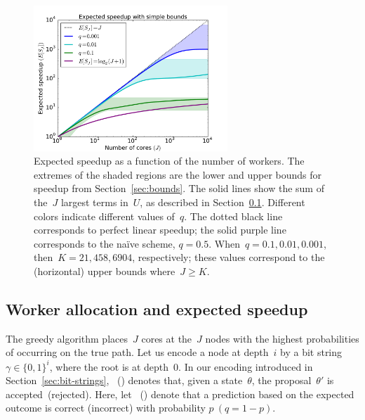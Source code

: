 \documentclass[angelino.tex]{subfiles}
\begin{document}
\begin{figure}[t!]
\centering
\includegraphics[width=0.65\textwidth]{figs/expected-speedup.pdf}
\caption{Expected speedup as a function of the number of workers.
The extremes of the shaded regions are the lower and upper bounds
for speedup from Section~\ref{sec:bounds}.
The solid lines show the sum of the~$J$ largest terms in~$U$, as described in
Section~\ref{sec:allocation}.
Different colors indicate different values of~$q$.
The dotted black line corresponds to perfect linear speedup;
the solid purple line corresponds to the na\"ive scheme, \ie ${q=0.5}$.
When~${q=0.1, 0.01, 0.001}$, then~${K=21, 458, 6904}$, respectively;
these values correspond to the (horizontal) upper bounds where~${J \ge K}$.
}
\label{fig:expected-speedup}
\end{figure}


\subsection{Worker allocation and expected speedup}
\label{sec:allocation}

The greedy algorithm places~$J$ cores at the~$J$ nodes with the
highest probabilities of occurring on the true path.  
Let us encode a node at depth~$i$ by a bit string 
${\gamma \in \{0, 1\}^i}$, where the root is at depth~0.
In our encoding introduced in Section~\ref{sec:bit-strings},
~() denotes that, given a state~$\theta$,
the proposal~$\theta'$ is accepted~(rejected).
Here, let ~() denote that a prediction based on the
expected outcome is correct (incorrect) with probability ${p~(q = 1-p)}$. 
\end{document}
